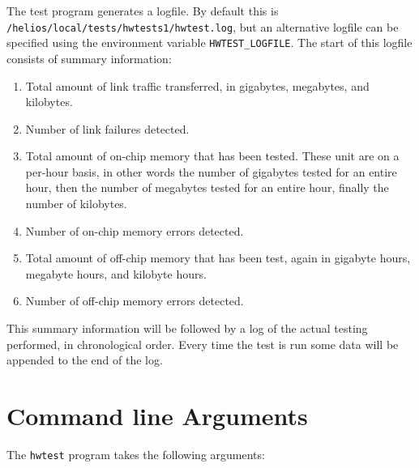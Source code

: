 The test program generates a logfile. By default this is \newline
{\tt /helios/local/tests/hwtests1/hwtest.log}, but an alternative logfile
can be specified using the environment variable \verb+HWTEST_LOGFILE+.
The start of this logfile consists of summary information:

\begin{enumerate}
\item Total amount of link traffic transferred, in gigabytes, megabytes,
and kilobytes.
\item Number of link failures detected.
\item Total amount of on-chip memory that has been tested. These
unit are on a per-hour basis, in other words the number of gigabytes
tested for an entire hour, then the number of megabytes tested for
an entire hour, finally the number of kilobytes.
\item Number of on-chip memory errors detected.
\item Total amount of off-chip memory that has been test, again in
gigabyte hours, megabyte hours, and kilobyte hours.
\item Number of off-chip memory errors detected.
\end{enumerate}

This summary information will be followed by a log of the actual
testing performed, in chronological order. Every time the test is run
some data will be appended to the end of the log.

\section{Command line Arguments}

The {\tt hwtest} program takes the following arguments:

